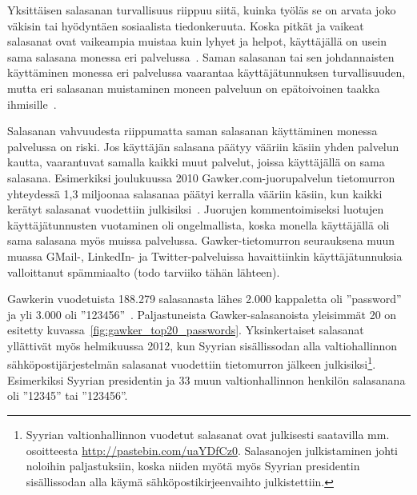 \documentclass[finnish,gradu]{tktltiki}
\begin{document}
  Yksittäisen salasanan turvallisuus riippuu siitä, kuinka työläs se on arvata joko väkisin tai hyödyntäen sosiaalista tiedonkeruuta. Koska pitkät ja vaikeat salasanat ovat vaikeampia muistaa kuin lyhyet ja helpot, käyttäjällä on usein sama salasana monessa eri palvelussa~\cite{study_of_passwords_07}. Saman salasanan tai sen johdannaisten käyttäminen monessa eri palvelussa vaarantaa käyttäjätunnuksen turvallisuuden, mutta eri salasanan muistaminen moneen palveluun on epätoivoinen taakka ihmisille~\cite{password_management_strategies_06, passpet_06, pw_auth_system_perspective_08, users_are_not_the_enemy_99}.

  Salasanan vahvuudesta riippumatta saman salasanan käyttäminen monessa palvelussa on riski. Jos käyttäjän salasana päätyy vääriin käsiin yhden palvelun kautta, vaarantuvat samalla kaikki muut palvelut, joissa käyttäjällä on sama salasana. Esimerkiksi joulukuussa 2010 Gawker.com-juorupalvelun tietomurron yhteydessä 1,3 miljoonaa salasanaa päätyi kerralla vääriin käsiin, kun kaikki kerätyt salasanat vuodettiin julkisiksi~\cite{bbc_gawker_12_2010, forbes_gawker_12_2010}. Juorujen kommentoimiseksi luotujen käyttäjätunnusten vuotaminen oli ongelmallista, koska monella käyttäjällä oli sama salasana myös muissa palvelussa. Gawker-tietomurron seurauksena muun muassa GMail-, LinkedIn- ja Twitter-palveluissa havaittiinkin käyttäjätunnuksia valloittanut spämmiaalto (todo tarviiko tähän lähteen).

   Gawkerin vuodetuista 188.279 salasanasta lähes 2.000 kappaletta oli ''password'' ja yli 3.000 oli  ''123456''~\cite{forbes_gawker_12_2010}. Paljastuneista Gawker-salasanoista yleisimmät 20 on esitetty kuvassa~\ref{fig:gawker_top20_passwords}. Yksinkertaiset salasanat yllättivät myös helmikuussa 2012, kun Syyrian sisällissodan alla valtiohallinnon sähköpostijärjestelmän salasanat vuodettiin tietomurron jälkeen julkisiksi\footnote{Syyrian valtionhallinnon vuodetut salasanat ovat julkisesti saatavilla mm. osoitteesta \url{http://pastebin.com/uaYDfCz0}. Salasanojen julkistaminen johti noloihin paljastuksiin, koska niiden myötä myös Syyrian presidentin sisällissodan alla käymä sähköpostikirjeenvaihto julkistettiin.}. Esimerkiksi Syyrian presidentin ja 33 muun valtionhallinnon henkilön salasanana oli ''12345'' tai ''123456''.
\end{document}

